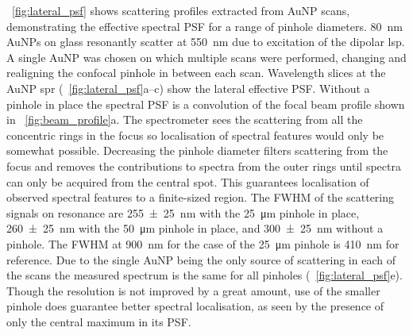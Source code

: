\documentclass{article}
\begin{document}
\figurename~\ref{fig:lateral_psf} shows scattering profiles extracted from AuNP scans, demonstrating the effective spectral PSF for a range of pinhole diameters. \SI{80}{nm} AuNPs on glass resonantly scatter at \SI{550}{nm} due to excitation of the dipolar \gls{lsp}. A single AuNP was chosen on which multiple scans were performed, changing and realigning the confocal pinhole in between each scan. Wavelength slices at the AuNP \gls{spr} (\figurename~\ref{fig:lateral_psf}a--c) show the lateral effective PSF. Without a pinhole in place the spectral PSF is a convolution of the focal beam profile shown in \figurename~\ref{fig:beam_profile}a. The spectrometer sees the scattering from all the concentric rings in the focus so localisation of spectral features would only be somewhat possible. Decreasing the pinhole diameter filters scattering from the focus and removes the contributions to spectra from the outer rings until spectra can only be acquired from the central spot. This guarantees localisation of observed spectral features to a finite-sized region. The FWHM of the scattering signals on resonance are \SI{255\pm25}{nm} with the \SI{25}{\micro\metre} pinhole in place, \SI{260\pm25}{nm} with the \SI{50}{\micro\metre} pinhole in place, and \SI{300\pm25}{nm} without a pinhole.
The FWHM at \SI{900}{nm} for the case of the \SI{25}{\micro\metre} pinhole is \SI{410}{nm} for reference. Due to the single AuNP being the only source of scattering in each of the scans the measured spectrum is the same for all pinholes (\figurename~\ref{fig:lateral_psf}e). Though the resolution is not improved by a great amount, use of the smaller pinhole does guarantee better spectral localisation, as seen by the presence of only the central maximum in its PSF.
\end{document}
